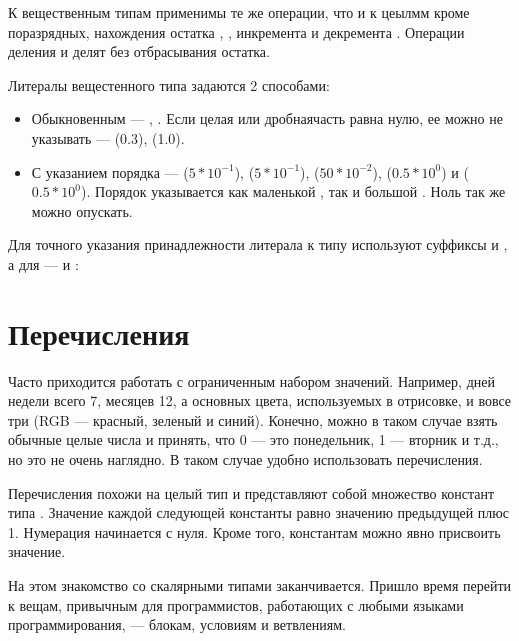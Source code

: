 \documentclass[book.tex]{subfiles}
\begin{document}
К вещественным типам применимы те же операции, что и к цеылмм кроме поразрядных, нахождения остатка \cppword{\%}, \cppword{\%=}, инкремента \cppword{++} и декремента \cppword{--}. Операции деления \cppword{/} и \cppword{/=} делят без отбрасывания остатка.

Литералы вещестенного типа задаются 2 способами:

\begin{itemize}
\item Обыкновенным --- , . Если целая или дробнаячасть равна нулю, ее можно не указывать ---  (0.3),  (1.0).
\item С указанием порядка ---  ($5*10^{-1}$),  ($5*10^{-1}$),  ($50*10^{-2}$),  ($0.5*10^{0}$) и  ($0.5*10^{0}$). Порядок указывается как маленькой , так и большой . Ноль так же можно опускать.
\end{itemize}

Для точного указания принадлежности литерала к типу  используют суффиксы  и , а для  ---  и :


\section*{Перечисления}

Часто приходится работать с ограниченным набором значений. Например, дней недели всего 7, месяцев 12, а основных цвета, используемых в отрисовке, и вовсе три (RGB --- красный, зеленый и синий). Конечно, можно в таком случае взять обычные целые числа и принять, что 0 --- это понедельник, 1 --- вторник и т.д., но это не очень наглядно. В таком случае удобно использовать перечисления.

Перечисления похожи на целый тип и представляют собой множество констант типа . Значение каждой следующей константы равно значению предыдущей плюс 1. Нумерация начинается с нуля. Кроме того, константам можно явно присвоить значение.


На этом знакомство со скалярными типами заканчивается. Пришло время перейти к вещам, привычным для программистов, работающих с любыми языками программирования, --- блокам, условиям и ветвлениям.
\end{document}
